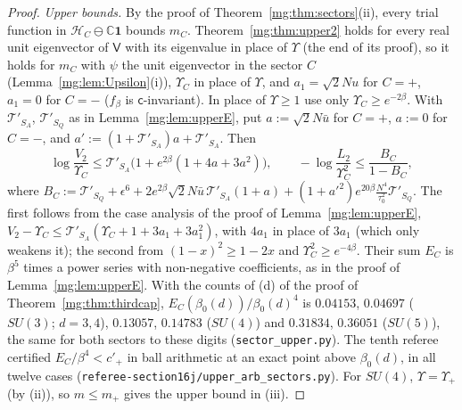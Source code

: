 \documentclass[11pt,a4paper]{article}
\theoremstyle{definition}
\theoremstyle{remark}
\newcommand{\C}{\mathbb{C}}
\begin{document}
\begin{proof}
\emph{Upper bounds.} By the proof of Theorem~\ref{mg:thm:sectors}(ii), every trial function in $\mathcal H_C\ominus\C\mathbf1$ bounds $m_C$. Theorem~\ref{mg:thm:upper2} holds for every real
unit eigenvector of $\mathsf V$ with its eigenvalue in place of $\Upsilon$ (the end of its proof), so it holds for $m_C$ with $\psi$ the unit eigenvector in the sector $C$
(Lemma~\ref{mg:lem:Upsilon}(i)), $\Upsilon_C$ in place of $\Upsilon$, and $a_1=\sqrt2Nu$ for $C=+$, $a_1=0$ for $C=-$ ($f_\beta$ is $\mathsf c$-invariant). In place of $\Upsilon\ge1$ use only
$\Upsilon_C\ge e^{-2\beta}$. With $\mathcal T'_{S_A}$, $\mathcal T'_{S_Q}$ as in Lemma~\ref{mg:lem:upperE}, put $a:=\sqrt2N\bar u$ for $C=+$, $a:=0$ for $C=-$, and $a':=(1+\mathcal T'_{S_A})a+\mathcal T'_{S_A}$.
Then
\[
\log\frac{V_2}{\Upsilon_C}\le\mathcal T'_{S_A}\bigl(1+e^{2\beta}(1+4a+3a^2)\bigr),\qquad -\log\frac{L_2}{\Upsilon_C^2}\le\frac{B_C}{1-B_C},
\]
where $B_C:=\mathcal T'_{S_Q}+\epsilon^6+2e^{2\beta}\sqrt2N\bar u\,\mathcal T'_{S_A}(1+a)+(1+a'^2)e^{20\beta}\frac{N^4}{\tau_0^2}\mathcal T'_{S_Q}$. The first follows from the case analysis of the proof of
Lemma~\ref{mg:lem:upperE}, $V_2-\Upsilon_C\le\mathcal T'_{S_A}(\Upsilon_C+1+3a_1+3a_1^2)$, with $4a_1$ in place of $3a_1$ (which only weakens it); the second from $(1-x)^2\ge1-2x$ and
$\Upsilon_C^2\ge e^{-4\beta}$. Their sum $E_C$ is $\beta^5$ times a power series with non-negative coefficients, as in the proof of Lemma~\ref{mg:lem:upperE}. With the counts of (d) of the proof of
Theorem~\ref{mg:thm:thirdcap}, $E_C(\beta_0(d))/\beta_0(d)^4$ is $0.04153$, $0.04697$ ($SU(3)$; $d=3,4$), $0.13057$, $0.14783$ ($SU(4)$) and $0.31834$, $0.36051$ ($SU(5)$), the same for both sectors
to these digits (\texttt{sector\_upper.py}). The tenth referee certified $E_C/\beta^4<c'_+$ in ball arithmetic at an exact point above $\beta_0(d)$, in all twelve cases
(\texttt{referee-section16j/\allowbreak upper\_arb\_sectors.py}). For $SU(4)$, $\Upsilon=\Upsilon_+$ (by (ii)), so $m\le m_+$ gives the upper bound in (iii).


\end{proof}
\end{document}
